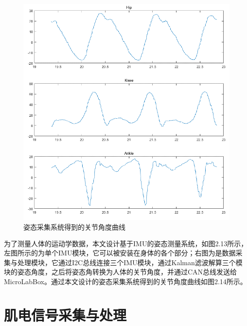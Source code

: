 \begin{figure}[!h]
    \includegraphics[width=13.5cm]{fig/f39.png}
    \caption{姿态采集系统得到的关节角度曲线}
    \label{fig:mark}
\end{figure}

为了测量人体的运动学数据，本文设计基于IMU的姿态测量系统，如图2.13所示，左图所示的为单个IMU模块，它可以被安装在身体的各个部分；右图为是数据采集与处理模块，它通过I2C总线连接三个IMU模块，通过Kalman滤波解算三个模块的姿态角度，之后将姿态角转换为人体的关节角度，并通过CAN总线发送给MicroLabBox。通过本文设计的姿态采集系统得到的关节角度曲线如图2.14所示。

\section{肌电信号采集与处理}
